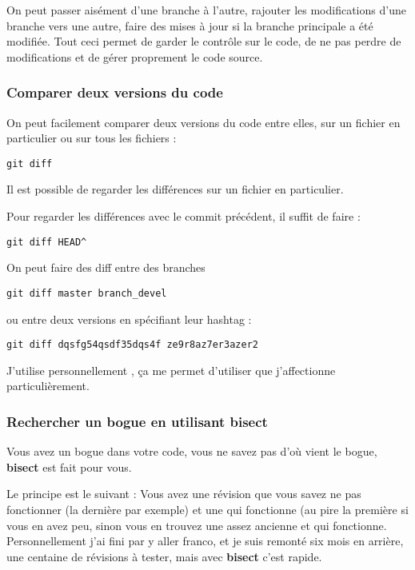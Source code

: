 \bigskip

On peut passer aisément d'une branche à l'autre, rajouter les modifications d'une branche vers une autre, faire des mises à jour si la branche principale a été modifiée. Tout ceci permet de garder le contrôle sur le code, de ne pas perdre de modifications et de gérer proprement le code source. 

\subsubsection{Comparer deux versions du code}
On peut facilement comparer deux versions du code entre elles, sur un fichier en particulier ou sur tous les fichiers : 
\begin{verbatim}
git diff
\end{verbatim}

\begin{remarque}
Il est possible de regarder les différences sur un fichier en particulier.
\end{remarque}

Pour regarder les différences avec le commit précédent, il suffit de faire :
\begin{verbatim}
git diff HEAD^
\end{verbatim}

\bigskip

On peut faire des diff entre des branches 
\begin{verbatim}
git diff master branch_devel
\end{verbatim}
ou entre deux versions en spécifiant leur hashtag : 
\begin{verbatim}
git diff dqsfg54qsdf35dqs4f ze9r8az7er3azer2
\end{verbatim}

J'utilise personnellement , ça me permet d'utiliser  que j'affectionne particulièrement.

\subsubsection{Rechercher un bogue en utilisant bisect}
Vous avez un bogue dans votre code, vous ne savez pas d'où vient le bogue, \textbf{bisect} est fait pour vous. 

Le principe est le suivant : Vous avez une révision que vous savez ne pas fonctionner (la dernière par exemple) et une qui fonctionne (au pire la première si vous en avez peu, sinon vous en trouvez une assez ancienne et qui fonctionne. Personnellement j'ai fini par y aller franco, et je suis remonté six mois en arrière, une centaine de révisions à tester, mais avec \textbf{bisect} c'est rapide. 


